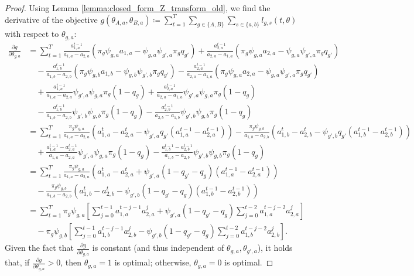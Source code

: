 \documentclass[letterpaper]{article} %
\begin{document}
\begin{proof}
Using Lemma \ref{lemma:closed_form_Z_transform_old}, we find the derivative of the objective $g(\theta_{A,a}, \theta_{B,a}) \coloneqq \sum_{t = 1}^T \sum_{g \in \{A, B\}} \sum_{s \in \{a,b\}}  l_{g,s}(t,\theta)$ with respect to $\theta_{g,a}$:
\begin{align*}
    \frac{\partial g}{\partial \theta_{g,a}} &= \sum_{t = 1}^T \frac{a_{1,a}^{t-1}}{a_{1,a}-a_{2,a}} \left(\pi_g \psi_{g,a} a_{1,a} - \psi_{g,a} \psi_{g',a} \pi_g q_{g'} \right) + \frac{a_{2,a}^{t-1}}{a_{2,a}-a_{1,a}} \left(\pi_g \psi_{g,a} a_{2,a} - \psi_{g,a} \psi_{g',a} \pi_g q_{g'} \right) \\
    &\quad - \frac{a_{1,b}^{t-1}}{a_{1,b}-a_{2,b}} \left(\pi_g \psi_{g,b} a_{1,b} - \psi_{g,b} \psi_{g',b} \pi_g q_{g'} \right) - \frac{a_{2,a}^{t-1}}{a_{2,a}-a_{1,a}} ( \pi_g \psi_{g,a} a_{2,a} - \psi_{g,a} \psi_{g',a} \pi_g q_{g'}) \\
    &\quad + \frac{a_{1,a}^{t-1}}{a_{1,a} -a_{2,a}} \psi_{g',a} \psi_{g,a} \pi_g (1-q_g) + \frac{a_{2,a}^{t-1}}{a_{2,a}- a_{1,a}}  \psi_{g',a} \psi_{g,a} \pi_g (1-q_g) \\
    &\quad - \frac{a_{1,b}^{t-1}}{ a_{1,b}-a_{2,b}}   \psi_{g',b} \psi_{g,b} \pi_g (1-q_g) - \frac{a_{2,b}^{t-1}}{a_{2,b}- a_{1,b}} \psi_{g',b} \psi_{g,b} \pi_g (1-q_g) \\
    &=\sum_{t = 1}^T \frac{\pi_g \psi_{g,a}}{a_{1,a}-a_{2,a}} \left( a_{1,a}^t - a_{2,a}^t -  \psi_{g',a} q_{g'} (a_{1,a}^{t-1} - a_{2,a}^{t-1}) \right) - \frac{\pi_g \psi_{g,b}}{a_{1,b}-a_{2,b}} \left( a_{1,b}^t - a_{2,b}^t -  \psi_{g',b} q_{g'} (a_{1,b}^{t-1} - a_{2,b}^{t-1}) \right) \\
    &\quad + \frac{a_{1,a}^{t-1} - a_{2,a}^{t-1}}{a_{1,a} -a_{2,a}}  \psi_{g',a} \psi_{g,a} \pi_g (1-q_g) - \frac{a_{1,b}^{t-1} - a_{2,b}^{t-1}}{a_{1,b} -a_{2,b}}  \psi_{g',b} \psi_{g,b} \pi_g (1-q_g) \\
    &= \sum_{t = 1}^T \frac{\pi_g \psi_{g,a}}{a_{1,a}-a_{2,a}} \left( a_{1,a}^t - a_{2,a}^t +  \psi_{g',a} (1-q_{g'} -q_g) (a_{1,a}^{t-1} - a_{2,a}^{t-1}) \right) \\
    &\quad - \frac{\pi_g \psi_{g,b}}{a_{1,b}-a_{2,b}} \left( a_{1,b}^t - a_{2,b}^t -  \psi_{g',b} (1-q_{g'}-q_g) (a_{1,b}^{t-1} - a_{2,b}^{t-1}) \right) \\
    &= \sum_{t = 1}^T \pi_g \psi_{g,a} \left [ \sum_{j=0}^{t-1} a_{1,a}^{t-j-1} a_{2,a}^j +\psi_{g',a} (1-q_{g'} -q_g)  \sum_{j=0}^{t-2} a_{1,a}^{t-j-2} a_{2,a}^j  \right] \\
    &\quad - \pi_g \psi_{g,b} \left [ \sum_{j=0}^{t-1} a_{1,b}^{t-j-1} a_{2,b}^j -\psi_{g',b} (1-q_{g'} -q_g)  \sum_{j=0}^{t-2} a_{1,b}^{t-j-2} a_{2,b}^j  \right].
\end{align*}
Given the fact that $\frac{\partial g}{\partial \theta_{g,a}}$ is constant (and thus independent of $\theta_{g,a}, \theta_{g',a}$), it holds that, if $\frac{\partial g}{\partial \theta_{g,a}}>0$, then $\theta_{g,a} =1$ is optimal; otherwise, $\theta_{g,a} =0$ is optimal.


\end{proof}
\end{document}
